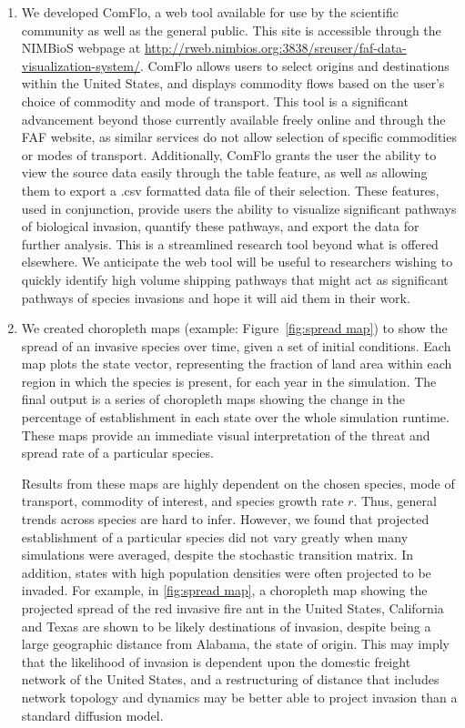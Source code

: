 \documentclass[12pt]{article}
\begin{document}
\begin{enumerate}

\item  We developed ComFlo, a web tool available for use by the scientific community as well as the general public. This site is accessible through the NIMBioS webpage at \url{http://rweb.nimbios.org:3838/sreuser/faf-data-visualization-system/}. ComFlo allows users to select origins and destinations within the United States, and displays commodity flows based on the user's choice of commodity and mode of transport. This tool is a significant advancement beyond those currently available freely online and through the FAF website, as similar services do not allow selection of specific commodities or modes of transport. Additionally, ComFlo grants the user the ability to view the source data easily through the table feature, as well as allowing them to export a .csv formatted data file of their selection. These features, used in conjunction, provide users the ability to visualize significant pathways of biological invasion, quantify these pathways, and export the data for further analysis. This is a streamlined research tool beyond what is offered elsewhere. We anticipate the web tool will be useful to researchers wishing to quickly identify high volume shipping pathways that might act as significant pathways of species invasions and hope it will aid them in their work. 

\item We created choropleth maps (example: Figure~\ref{fig:spread map}) to show the spread of an invasive species over time, given a set of initial conditions. Each map plots the state vector, representing the fraction of land area within each region in which the species is present, for each year in the simulation. The final output is a series of choropleth maps showing the change in the percentage of establishment in each state over the whole simulation runtime. These maps provide an immediate visual interpretation of the threat and spread rate of a particular species.

 Results from these maps are highly dependent on the chosen species, mode of transport, commodity of interest, and species growth rate $r$.  Thus, general trends across species are hard to infer.  However, we found that projected establishment of a particular species did not vary greatly when many simulations were averaged, despite the stochastic transition matrix.  In addition, states with high population densities were often projected to be invaded.  For example, in \ref{fig:spread map}, a choropleth map showing the projected spread of the red invasive fire ant in the United States, California and Texas are shown to be likely destinations of invasion, despite being a large geographic distance from Alabama, the state of origin.  This may imply that the likelihood of invasion is dependent upon the domestic freight network of the United States, and a restructuring of distance that includes network topology and dynamics may be better able to project invasion than a standard diffusion model.


\end{enumerate}
\end{document}
